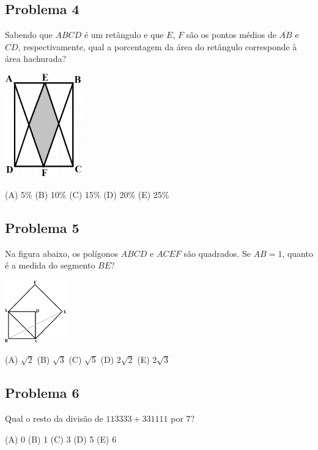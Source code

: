 \documentclass[12pt]{article}
\begin{document}
\subsection{Problema 4}
\begin{tcolorbox}[statementbox]
Sabendo que $ABCD$ é um retângulo e que $E$, $F$ são os pontos médios de $\overline{AB}$ e $\overline{CD}$, respectivamente, qual a porcentagem da área do retângulo corresponde à área hachurada?

  \begin{center}
  \includegraphics[width=0.25\textwidth]{first.png}
\end{center}


(A) 5\% (B) 10\% (C) 15\% (D) 20\% (E) 25\%
\end{tcolorbox}
\clearpage

\subsection{Problema 5}
\begin{tcolorbox}[statementbox]
Na figura abaixo, os polígonos $ABCD$ e $ACEF$ são quadrados. Se $AB=1$, quanto é a medida do segmento $BE$?

  \begin{center}
  \includegraphics[width=0.2\textwidth]{second.png}
\end{center}


(A) $\sqrt{2}$ (B) $\sqrt{3}$ (C) $\sqrt{5}$ (D) $2\sqrt{2}$ (E) $2\sqrt{3}$
\end{tcolorbox}
\clearpage

\subsection{Problema 6}
\begin{tcolorbox}[statementbox]
Qual o resto da divisão de $113333 + 331111$ por $7$?

(A) 0 (B) 1 (C) 3 (D) 5 (E) 6
\end{tcolorbox}
\clearpage
\end{document}
